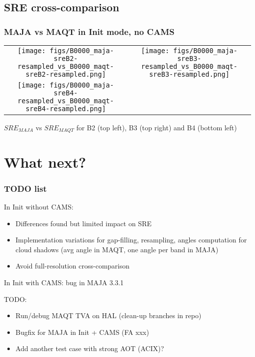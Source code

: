 \documentclass[8pt]{beamer}
\begin{document}
\subsection{SRE cross-comparison}
\begin{frame}
\frametitle{MAJA vs MAQT in Init mode, no CAMS}
		\begin{tabular}{cc}
			\texttt{[image: figs/B0000\_maja-sreB2-resampled\_vs\_B0000\_maqt-sreB2-resampled.png]} & \texttt{[image: figs/B0000\_maja-sreB3-resampled\_vs\_B0000\_maqt-sreB3-resampled.png]} \\ 
			 
			\texttt{[image: figs/B0000\_maja-sreB4-resampled\_vs\_B0000\_maqt-sreB4-resampled.png]} &  \\ 
		\end{tabular} 
		
		$SRE_{MAJA}$ vs $SRE_{MAQT}$ for B2 (top left), B3 (top right) and B4 (bottom left)
\end{frame}


\section{What next?}
\begin{frame}
\frametitle{TODO list}
	In Init without CAMS:
	\begin{itemize}
		\item Differences found but limited impact on SRE
		\item Implementation variations for gap-filling, resampling, angles computation for cloud shadows (avg angle in MAQT, one angle per band in MAJA)
		\item Avoid full-resolution cross-comparison
	\end{itemize}
	
	In Init with CAMS: bug in MAJA 3.3.1

	TODO:
	\begin{itemize}
		\item Run/debug MAQT TVA on HAL (clean-up branches in repo)
		\item Bugfix for MAJA in Init + CAMS (FA xxx)
		\item Add another test case with strong AOT (ACIX)?
	\end{itemize}
\end{frame}
\end{document}
